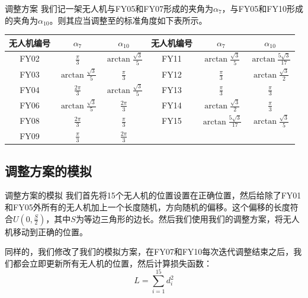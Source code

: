 \documentclass[aspectratio=169]{beamer}
\begin{document}
\begin{frame}{调整方案}
    我们记一架无人机与FY05和FY07形成的夹角为$\alpha_7$，与FY05和FY10形成的夹角为$\alpha_{10}$。则其应当调整至的标准角度如下表所示。
    \begin{table}[!ht]
        \centering
        \begin{tabular}{ccc|ccc}
        \toprule
            无人机编号 & $\alpha_7$ & $\alpha_{10}$ & 无人机编号 & $\alpha_7$ & $\alpha_{10}$ \\ 
            \midrule
            FY02 & $\frac{\pi}{3}$ & $\arctan\frac{\sqrt{3}}{5}$ & FY11 & $\arctan\frac{\sqrt{3}}{5}$ & $\arctan\frac{5\sqrt{3}}{17}$ \\ 
            FY03 & $\arctan\frac{\sqrt{3}}{5}$ & $\frac{\pi}{3}$ & FY12 & $\frac{\pi}{3}$ & $\arctan\frac{\sqrt{3}}{2}$\\ 
            FY04 & $\frac{2\pi}{3}$ & $\arctan\frac{\sqrt{3}}{5}$ & FY13 & $\frac{\pi}{3}$ & $\frac{\pi}{3}$ \\ 
            FY06 & $\arctan\frac{\sqrt{3}}{5}$ & $\frac{2\pi}{3}$ & FY14 & $\arctan\frac{\sqrt{3}}{2}$ & $\frac{\pi}{3}$ \\ 
            FY08 & $\frac{2\pi}{3}$ & $\frac{\pi}{3}$ & FY15 & $\arctan\frac{5\sqrt{3}}{17}$ & $\arctan\frac{\sqrt{3}}{5}$ \\ 
            FY09 & $\frac{\pi}{3}$ & $\frac{2\pi}{3}$ \\ 
        \bottomrule
        \end{tabular}
    \end{table}
\end{frame}

\subsection{调整方案的模拟}

\begin{frame}{调整方案的模拟}
    我们首先将15个无人机的位置设置在正确位置，然后给除了FY01和FY05外所有的无人机加上一个长度随机，方向随机的偏移。这个偏移的长度符合$U\left(0,\frac{S}{2}\right)$，其中$S$为等边三角形的边长。然后我们使用我们的调整方案，将无人机移动到正确的位置。

    同样的，我们修改了我们的模拟方案，在FY07和FY10每次迭代调整结束之后，我们都会立即更新所有无人机的位置，然后计算损失函数：
    \begin{equation}
        L = \sum_{i=1}^{15} d_i^2
    \end{equation}
\end{frame}
\end{document}
